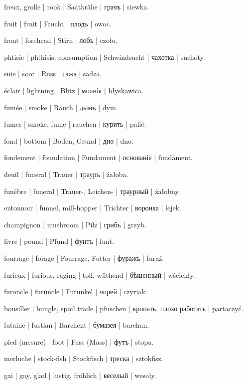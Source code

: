\begin{outdent}{1em}
freux, grolle | rook | Saatkrähe | грачъ | siewka.

fruit | fruit | Frucht | плодъ | owoc.

front | forehead | Stirn | лобъ | czoło.

phtisie | phthisis, consumption | Schwindsucht | чахотка | suchoty.

suie | soot | Russ | сажа | sadza.

éclair | lightning | Blitz | молнія | błyskawica.

fumée | smoke | Rauch | дымъ | dym.

\uvsubentry{}
fumer | smoke, fume | rauchen | курить | palić.

fond | bottom | Boden, Grund | дно | dno.

fondement | foundation | Fundament | основаніе | fundament.

deuil | funeral | Trauer | трауръ | źałoba.

\uvsubentry{}
funèbre | funeral | Trauer-, Leichen- | траурный | źałobny.

entonnoir | funnel, mill-hopper | Trichter | воронка | lejek.

champignon | mushroom | Pilz | грибъ | grzyb.

livre | pound | Pfund | фунтъ | funt.

fourrage | forage | Fourrage, Futter | фуражъ | furaź.

furieux | furious, raging | toll, wüthend | бѣшенный | wściekły.

furoncle | furuncle | Furunkel | чирей | czyriak.

bousiller | bungle, spoil trade | pfuschen | кропать, плохо
работать | partaczyć.

futaine | fustian | Barchent | бумазея | barchan.

pied (mesure) | foot | Fuss (Mass) | футъ | stopa.


merluche | stock-fish | Stockfisch | треска | sztokfisz.

gai | gay, glad | lustig, fröhlich | веселый | wesoły.


\end{outdent}

